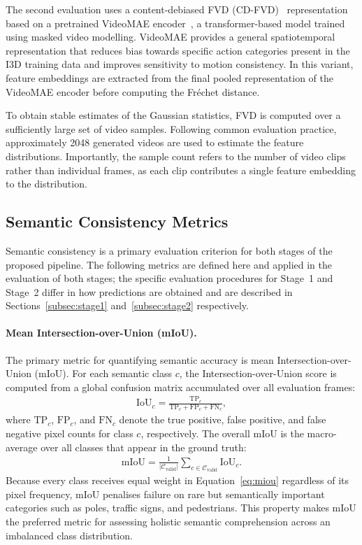 The second evaluation uses a content-debiased FVD (CD-FVD)~\cite{ge2024cdfvd} representation based on a pretrained VideoMAE encoder~\cite{tong2022videomae}, a transformer-based model trained using masked video modelling. VideoMAE provides a general spatiotemporal representation that reduces bias towards specific action categories present in the I3D training data and improves sensitivity to motion consistency. In this variant, feature embeddings are extracted from the final pooled representation of the VideoMAE encoder before computing the Fr\'echet distance.

To obtain stable estimates of the Gaussian statistics, FVD is computed over a sufficiently large set of video samples. Following common evaluation practice, approximately 2048 generated videos are used to estimate the feature distributions. Importantly, the sample count refers to the number of video clips rather than individual frames, as each clip contributes a single feature embedding to the distribution.

\subsection{Semantic Consistency Metrics}
\label{subsec:miou}

Semantic consistency is a primary evaluation criterion for both stages of the proposed pipeline. The following metrics are defined here and applied in the evaluation of both stages; the specific evaluation procedures for Stage~1 and Stage~2 differ in how predictions are obtained and are described in Sections~\ref{subsec:stage1} and~\ref{subsec:stage2} respectively.

\paragraph{Mean Intersection-over-Union (mIoU).}
The primary metric for quantifying semantic accuracy is mean Intersection-over-Union (mIoU). For each semantic class $c$, the Intersection-over-Union score is computed from a global confusion matrix accumulated over all evaluation frames:
\begin{align}
    \text{IoU}_c = \frac{\text{TP}_c}{\text{TP}_c + \text{FP}_c + \text{FN}_c},
    \label{eq:iou}
\end{align}
where $\text{TP}_c$, $\text{FP}_c$, and $\text{FN}_c$ denote the true positive, false positive, and false negative pixel counts for class $c$, respectively. The overall mIoU is the macro-average over all classes that appear in the ground truth:
\begin{align}
    \text{mIoU} = \frac{1}{|\mathcal{C}_{\text{valid}}|} \sum_{c \in \mathcal{C}_{\text{valid}}} \text{IoU}_c.
    \label{eq:miou}
\end{align}
Because every class receives equal weight in Equation~\eqref{eq:miou} regardless of its pixel frequency, mIoU penalises failure on rare but semantically important categories such as poles, traffic signs, and pedestrians. This property makes mIoU the preferred metric for assessing holistic semantic comprehension across an imbalanced class distribution.

